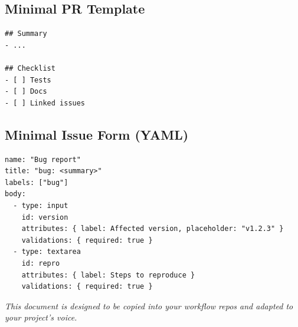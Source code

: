 \documentclass[11pt]{article}
\begin{document}
\subsection*{Minimal PR Template}
\begin{verbatim}
## Summary
- ...

## Checklist
- [ ] Tests
- [ ] Docs
- [ ] Linked issues
\end{verbatim}

\subsection*{Minimal Issue Form (YAML)}
\begin{verbatim}
name: "Bug report"
title: "bug: <summary>"
labels: ["bug"]
body:
  - type: input
    id: version
    attributes: { label: Affected version, placeholder: "v1.2.3" }
    validations: { required: true }
  - type: textarea
    id: repro
    attributes: { label: Steps to reproduce }
    validations: { required: true }
\end{verbatim}

\vfill
\begin{center}\small
\textit{This document is designed to be copied into your workflow repos and adapted to your project's voice.}
\end{center}
\end{document}
